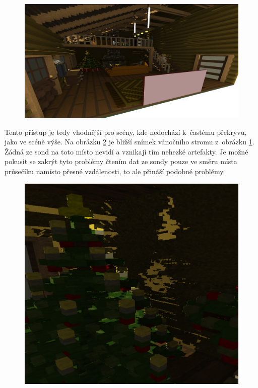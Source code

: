\begin{figure}[H]
	\centering
	\captionsetup{justification=centering}
	\includegraphics[scale=0.9]{images/render_svo_indirect_1.png}
	\label{fig:render_indirect_1}
\end{figure}

Tento přístup je tedy vhodnější pro scény, kde nedochází k~častému překryvu, jako ve scéně výše. Na obrázku \ref{fig:tree_closeup} je bližší snímek vánočního stromu z~obrázku \ref{fig:render_indirect_1}. Žádná ze sond na toto místo nevidí a vznikají tím nehezké artefakty. Je možné pokusit se zakrýt tyto problémy čtením dat ze sondy pouze ve směru místa průsečíku namísto přesné vzdálenosti, to ale přináší podobné problémy. 

\begin{figure}[H]
	\centering
	\captionsetup{justification=centering}
	\includegraphics[scale=1.15]{images/tree_closeup.png}
	\label{fig:tree_closeup}
\end{figure}


